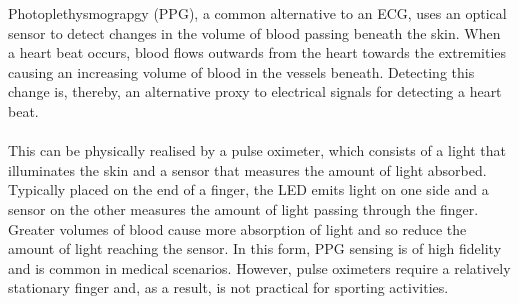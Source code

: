 Photoplethysmograpgy (PPG), a common alternative to an ECG, uses an optical sensor to detect changes in the volume of blood passing beneath the skin.
When a heart beat occurs, blood flows outwards from the heart towards the extremities causing an increasing volume of blood in the vessels beneath.
Detecting this change is, thereby, an alternative proxy to electrical signals for detecting a heart beat.
\\\\
This can be physically realised by a pulse oximeter, which consists of a light that illuminates the skin and a sensor that measures the amount of light absorbed. 
Typically placed on the end of a finger, the LED emits light on one side and a sensor on the other measures the amount of light passing through the finger.
Greater volumes of blood cause more absorption of light and so reduce the amount of light reaching the sensor.
In this form, PPG sensing is of high fidelity and is common in medical scenarios. However, pulse oximeters require a relatively stationary finger and, as a result, is not practical for sporting activities. 


